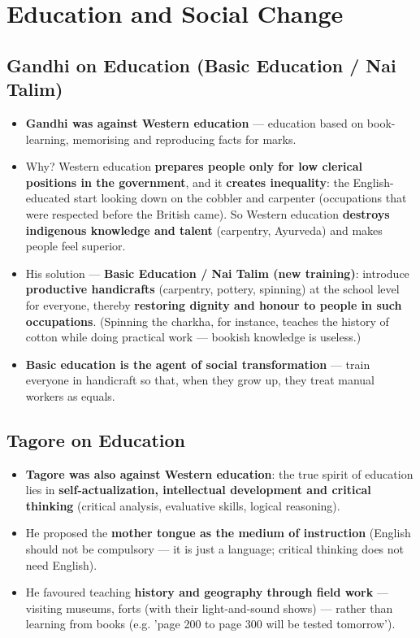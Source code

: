 \chapter{Education and Social Change}

\section{Gandhi on Education (Basic Education / Nai Talim)}

\begin{KeyConcept}
\begin{itemize}
\item \textbf{Gandhi was against Western education} --- education based on book-learning, memorising and reproducing facts for marks.
\item Why? Western education \textbf{prepares people only for low clerical positions in the government}, and it \textbf{creates inequality}: the English-educated start looking down on the cobbler and carpenter (occupations that were respected before the British came). So Western education \textbf{destroys indigenous knowledge and talent} (carpentry, Ayurveda) and makes people feel superior.
\item His solution --- \textbf{Basic Education / Nai Talim (new training)}: introduce \textbf{productive handicrafts} (carpentry, pottery, spinning) at the school level for everyone, thereby \textbf{restoring dignity and honour to people in such occupations}. (Spinning the charkha, for instance, teaches the history of cotton while doing practical work --- bookish knowledge is useless.)
\item \textbf{Basic education is the agent of social transformation} --- train everyone in handicraft so that, when they grow up, they treat manual workers as equals.
\end{itemize}
\end{KeyConcept}

\section{Tagore on Education}

\begin{KeyConcept}
\begin{itemize}
\item \textbf{Tagore was also against Western education}: the true spirit of education lies in \textbf{self-actualization, intellectual development and critical thinking} (critical analysis, evaluative skills, logical reasoning).
\item He proposed the \textbf{mother tongue as the medium of instruction} (English should not be compulsory --- it is just a language; critical thinking does not need English).
\item He favoured teaching \textbf{history and geography through field work} --- visiting museums, forts (with their light-and-sound shows) --- rather than learning from books (e.g. 'page 200 to page 300 will be tested tomorrow').
\end{itemize}
\end{KeyConcept}

